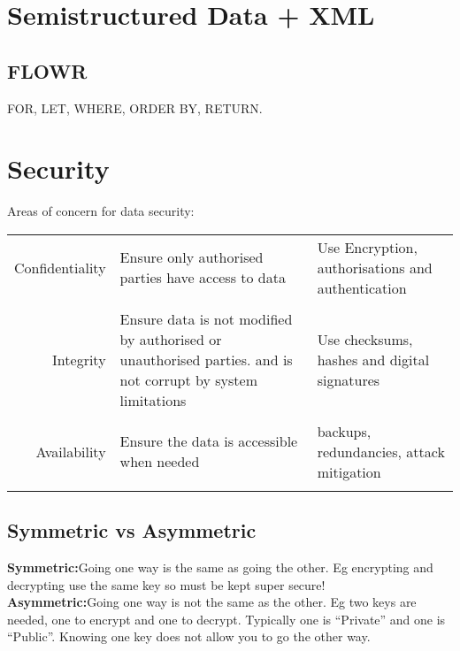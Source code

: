 \documentclass[10pt]{article}
\begin{document}
  \section*{Semistructured Data + XML}
    \subsection*{FLOWR}
       FOR, LET, WHERE, ORDER BY, RETURN.

  \section*{Security}
    Areas of concern for data security:\\
    \begin{tabular}{r | p{6cm} | p{6cm} } 
      Confidentiality & Ensure only authorised parties have access to data & Use Encryption, authorisations and authentication\\ & & \\
      Integrity & Ensure data is not modified by authorised or unauthorised parties. and is not corrupt by system limitations & Use checksums, hashes and digital signatures\\ & & \\
      Availability & Ensure the data is accessible when needed & backups, redundancies, attack mitigation\\ & & \\
    \end{tabular}

    \subsection*{Symmetric vs Asymmetric}
      \textbf{Symmetric:}Going one way is the same as going the other. Eg encrypting and decrypting use the same key so must be kept super secure!\\
      \textbf{Asymmetric:}Going one way is not the same as the other. Eg two keys are needed, one to encrypt and one to decrypt. Typically one is ``Private'' and one is ``Public''. Knowing one key does not allow you to go the other way.
\end{document}
